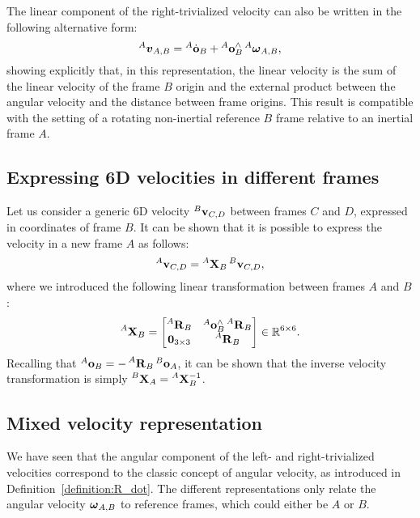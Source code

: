 The linear component of the right-trivialized velocity can also be written in the following alternative form:
%
\begin{equation}
    \label{eq:vel_lin_inertial_fixed}
    \vellin[A]_{A,B} = \orid[A]_B + \ori[A]_B^\wedge \velang[A]_{A,B}
    ,
\end{equation}
%
showing explicitly that, in this representation, the linear velocity is the sum of the linear velocity of the frame $B$ origin and the external product between the angular velocity and the distance between frame origins.
This result is compatible with the setting of a rotating non-inertial reference $B$ frame relative to an inertial frame $A$.

\subsection{Expressing 6D velocities in different frames}

Let us consider a generic 6D velocity $\velsix[B]_{C, D}$ between frames $C$ and $D$, expressed in coordinates of frame $B$.
It can be shown that it is possible to express the velocity in a new frame $A$ as follows:
%
\begin{equation*}
    \velsix[A]_{C, D} = \veladj[A]_B \velsix[B]_{C, D}
    ,
\end{equation*}
%
where we introduced the following linear transformation between frames $A$ and $B$:
%
\begin{equation}
    \label{equation:velocity_adjoint}
    \veladj[A]_B =
    \begin{bmatrix}
        \rot[A]_B & \ori[A]_B^\wedge \rot[A]_B \\
        \zeros_{3\times3} & \rot[A]_B
    \end{bmatrix}
    \in \realn^{6\times6}
    .
\end{equation}
%
Recalling that $\ori[A]_B = -\rot[A]_B \ori[B]_A$, it can be shown that the inverse velocity transformation is simply $\veladj[B]_A = \veladj[A]_B^{-1}$.

\subsection{Mixed velocity representation}

We have seen that the angular component of the left- and right-trivialized velocities correspond to the classic concept of angular velocity, as introduced in Definition~\ref{definition:R_dot}.
The different representations only relate the angular velocity $\velang_{A,B}$ to reference frames, which could either be $A$ or $B$.

